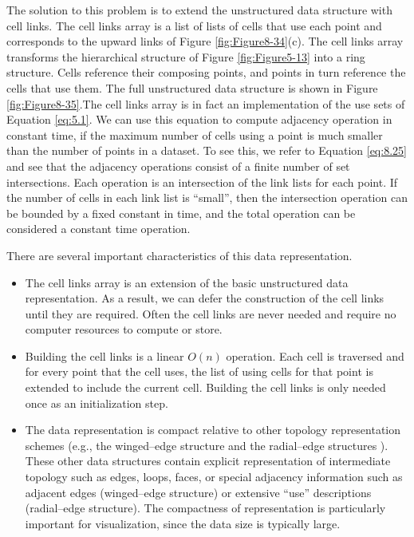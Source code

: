 The solution to this problem is to extend the unstructured data structure with cell links. The cell links array is a list of lists of cells that use each point and corresponds to the upward links of Figure \ref{fig:Figure8-34}(c). The cell links array transforms the hierarchical structure of Figure \ref{fig:Figure5-13} into a ring structure. Cells reference their composing points, and points in turn reference the cells that use them. The full unstructured data structure is shown in Figure \ref{fig:Figure8-35}.The cell links array is in fact an implementation of the use sets of Equation \ref{eq:5.1}. We can use this equation to compute adjacency operation in constant time, if the maximum number of cells using a point is much smaller than the number of points in a dataset. To see this, we refer to Equation \ref{eq:8.25} and see that the adjacency operations consist of a finite number of set intersections. Each operation is an intersection of the link lists for each point. If the number of cells in each link list is ``small'', then the intersection operation can be bounded by a fixed constant in time, and the total operation can be considered a constant time operation.

There are several important characteristics of this data representation.

\begin{itemize}

\item The cell links array is an extension of the basic unstructured data representation. As a result, we can defer the construction of the cell links until they are required. Often the cell links are never needed and require no computer resources to compute or store.

\item Building the cell links is a linear $O(n)$ operation. Each cell is traversed and for every point that the cell uses, the list of using cells for that point is extended to include the current cell. Building the cell links is only needed once as an initialization step.

\item The data representation is compact relative to other topology representation schemes (e.g., the winged--edge structure and the radial--edge structures \cite{Baumgart74} \cite{Weiler88}). These other data structures contain explicit representation of intermediate topology such as edges, loops, faces, or special adjacency information such as adjacent edges (winged--edge structure) or extensive ``use'' descriptions (radial--edge structure). The compactness of representation is particularly important for visualization, since the data size is typically large.

\end{itemize}


